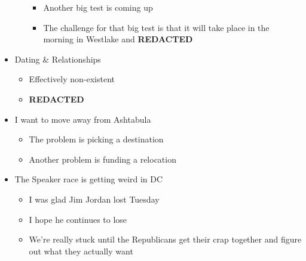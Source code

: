 \begin{itemize}
\begin{itemize}
    \begin{itemize}
    \tightlist
    \item
      Another big test is coming up
    \item
      The challenge for that big test is that it will take place in the
      morning in Westlake and \textbf{REDACTED}
    \end{itemize}
  \end{itemize}
\item
  Dating \& Relationships

  \begin{itemize}
  \tightlist
  \item
    Effectively non-existent
  \item
    \textbf{REDACTED}
  \end{itemize}
\item
  I want to move away from Ashtabula

  \begin{itemize}
  \tightlist
  \item
    The problem is picking a destination
  \item
    Another problem is funding a relocation
  \end{itemize}
\item
  The Speaker race is getting weird in DC

  \begin{itemize}
  \tightlist
  \item
    I was glad Jim Jordan lost Tuesday
  \item
    I hope he continues to lose
  \item
    We're really stuck until the Republicans get their crap together and
    figure out what they actually want
  \end{itemize}
\end{itemize}
